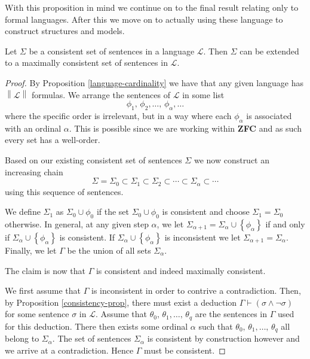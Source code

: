 \documentclass[../../main.tex]{subfiles}
\begin{document}
With this proposition in mind we continue on to the final result relating only to formal languages.
After this we move on to actually using these language to construct structures and models.

\begin{theorem}\label{lindenbaums-theorem}\cite[Proposition 1.3.11]{Cha90}
    Let $\Sigma$ be a consistent set of sentences in a language $\mathcal{L}$.
    Then $\Sigma$ can be extended to a maximally consistent set of sentences in $\mathcal{L}$.
\end{theorem}

\begin{proof}\cite[Lemma 1.2.9]{Cha90}  
    By Proposition \ref{language-cardinality} we have that any given language has $\left\lVert \mathcal{L}\right\rVert$ formulas.
    We arrange the sentences of $\mathcal{L}$ in some list
    $$\phi_1,\, \phi_2,\ldots,\, \phi_{\alpha},\ldots$$
    where the specific order is irrelevant, but in a way where each $\phi_{\alpha}$ is associated with an ordinal $\alpha$.
    This is possible since we are working within \textbf{ZFC} and as such every set has a well-order.

    Based on our existing consistent set of sentences $\Sigma$ we now construct an increasing chain
    $$\Sigma = \Sigma_0 \subset \Sigma_1 \subset \Sigma_2 \subset \cdots \subset \Sigma_{\alpha} \subset \cdots$$
    using this sequence of sentences.
    
    We define $\Sigma_1$ as $\Sigma_0 \cup \phi_0$ if the set $\Sigma_0 \cup \phi_0$ is consistent and choose $\Sigma_1 = \Sigma_0$ otherwise.
    In general, at any given step $\alpha$, we let $\Sigma_{\alpha + 1} = \Sigma_{\alpha} \cup \left\{\phi_{\alpha}\right\}$
    if and only if $\Sigma_{\alpha} \cup \left\{\phi_{\alpha}\right\}$ is consistent.
    If $\Sigma_{\alpha} \cup \left\{\phi_{\alpha}\right\}$ is inconsistent we let $\Sigma_{\alpha + 1} = \Sigma_{\alpha}$.
    Finally, we let $\Gamma$ be the union of all sets $\Sigma_{\alpha}$.

    The claim is now that $\Gamma$ is consistent and indeed maximally consistent.

    We first assume that $\Gamma$ is inconsistent in order to contrive a contradiction.
    Then, by Proposition \ref{consistency-prop}, there must exist a deduction $\Gamma \vdash \left(\sigma \wedge \lnot\sigma\right)$ for some sentence $\sigma$ in $\mathcal{L}$.
    Assume that $\theta_0,\, \theta_1, \ldots,\, \theta_q$ are the sentences in $\Gamma$ used for this deduction.
    There then exists some ordinal $\alpha$ such that $\theta_0,\, \theta_1, \ldots,\, \theta_q$ all belong to $\Sigma_{\alpha}$.
    The set of sentences $\Sigma_{\alpha}$ is consistent by construction however and we arrive at a contradiction.
    Hence $\Gamma$ must be consistent.


\end{proof}
\end{document}
